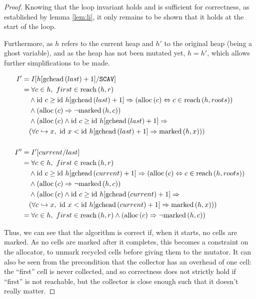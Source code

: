 \begin{proof}
  Knowing that the loop invariant holds and is sufficient for
  correctness, as established by lemma \ref{lem:li}, it only remains
  to be shown that it holds at the start of the loop.

  \begin{prooftree}
  \end{prooftree}

Furthermore, as $h$ refers to the current heap and $h'$ to the
original heap (being a ghost variable), and as the heap has not been
mutated yet, $h = h'$, which allows further simplifications to be made.

  \begin{align*}
    I' &= I[h[\gchead{last} + 1] / \mathtt{SCAV}]\\
%
    &= \forall c \in h,\ first \in \reach{h}{r}\\
    &\quad\land \id~c \geq \id~h[\gchead{last} + 1] \implies
    (\alloc{c} \iff c \in \reach{h}{roots})\\
    &\quad\land (\alloc{c} \implies \lnot \marked{h}{c})\\
    &\quad\land (\alloc{c} \land \id~c \geq \id~h[\gchead{last}+1] \implies\\
    &\quad(\forall c \pointsto x,\ \id~x < \id~h[\gchead{last} + 1]
    \implies \marked{h}{x}))\\\\
%
    I'' &= I'[current / last]\\
    &= \forall c \in h,\ first \in \reach{h}{r}\\
    &\quad\land \id~c \geq \id~h[\gchead{current} + 1] \implies
    (\alloc{c} \iff c \in \reach{h}{roots})\\
    &\quad\land (\alloc{c} \implies \lnot
    \marked{h}{c})\\
    &\quad\land (\alloc{c} \land \id~c \geq \id~h[\gchead{current}+1]
    \implies\\
    &\quad(\forall c \pointsto x,\ \id~x < \id~h[\gchead{current} + 1]
    \implies \marked{h}{x}))\\
%
    &= \forall c \in h,\ first \in \reach{h}{r} \land (\alloc{c}
    \implies \lnot \marked{h}{c})
  \end{align*}

  Thus, we can see that the algorithm is correct if, when it starts,
  no \glspl{cell} are marked. As no \glspl{cell} are marked after it
  completes, this becomes a constraint on the allocator, to unmark
  recycled \glspl{cell} before giving them to the
  \gls{mutator}. It can also be seen from the precondition that the
  \gls{collector} has an overhead of one \gls{cell}: the ``first''
  \gls{cell} is never collected, and so correctness does not strictly
  hold if ``first'' is not reachable, but the \gls{collector} is close
  enough such that it doesn't really matter.
\end{proof}


